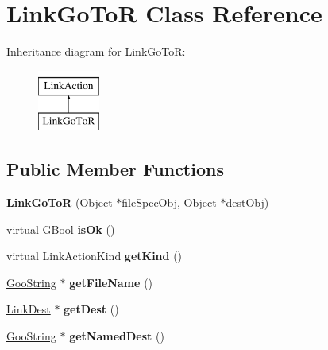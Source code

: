 \hypertarget{class_link_go_to_r}{}\section{Link\+Go\+ToR Class Reference}
\label{class_link_go_to_r}
Inheritance diagram for Link\+Go\+ToR\+:\begin{figure}[H]
\begin{center}
\leavevmode
\includegraphics[height=2.000000cm]{class_link_go_to_r}
\end{center}
\end{figure}
\subsection*{Public Member Functions}
\begin{DoxyCompactItemize}
\item 
\mbox{\label{class_link_go_to_r_a6ee0e9cc2c8cf80d561e6d1a6980c057}} 
{\bfseries Link\+Go\+ToR} (\hyperlink{class_object}{Object} $\ast$file\+Spec\+Obj, \hyperlink{class_object}{Object} $\ast$dest\+Obj)
\item 
\mbox{\label{class_link_go_to_r_add1bae847ab9c40df6e8d9e1566b598b}} 
virtual G\+Bool {\bfseries is\+Ok} ()
\item 
\mbox{\label{class_link_go_to_r_a61d9976bc0e846b347de236105e62e13}} 
virtual Link\+Action\+Kind {\bfseries get\+Kind} ()
\item 
\mbox{\label{class_link_go_to_r_a69d9db1d1cd091a1195377c1a78551f4}} 
\hyperlink{class_goo_string}{Goo\+String} $\ast$ {\bfseries get\+File\+Name} ()
\item 
\mbox{\label{class_link_go_to_r_a8a570586a95f24dc5b5a8fb91ec561ff}} 
\hyperlink{class_link_dest}{Link\+Dest} $\ast$ {\bfseries get\+Dest} ()
\item 
\mbox{\label{class_link_go_to_r_a63b6ce434ac68b4b3d7ae84d4fea58df}} 
\hyperlink{class_goo_string}{Goo\+String} $\ast$ {\bfseries get\+Named\+Dest} ()
\end{DoxyCompactItemize}
